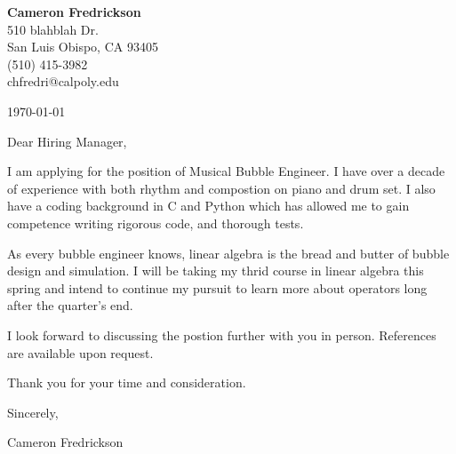 \documentclass[11pt]{article}
\begin{document}
\textbf{Cameron Fredrickson} \\
510 blahblah Dr. \\
San Luis Obispo, CA 93405 \\
(510) 415-3982 \\
chfredri@calpoly.edu

\bigskip

\today

\bigskip

Dear Hiring Manager,

I am applying for the position of Musical Bubble Engineer. I have over a decade
of experience with both rhythm and compostion on piano and drum set. I also
have a coding background in C and Python which has allowed me to gain competence
writing rigorous code, and thorough tests.

As every bubble engineer knows, linear algebra is the bread and butter of
bubble design and simulation. I will be taking my thrid course in linear
algebra this spring and intend to continue my pursuit to learn more about
operators long after the quarter's end.

I look forward to discussing the postion further with you in person. References are available upon request.

Thank you for your time and consideration.

Sincerely,

Cameron Fredrickson
\end{document}
